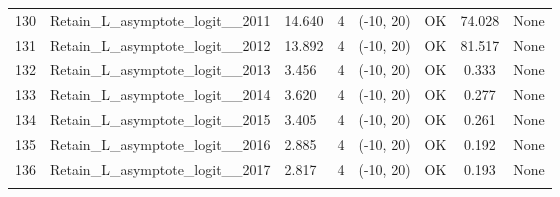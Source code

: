\documentclass[12pt,]{article}
\begin{document}
\begin{landscape}
\begin{longtable}{lp{2.5in}lrcccl}
  130 & Retain\_L\_asymptote\_logit\_\_2011 & 14.640 & 4 & (-10, 20) & OK & 74.028 & None \\ 
  131 & Retain\_L\_asymptote\_logit\_\_2012 & 13.892 & 4 & (-10, 20) & OK & 81.517 & None \\ 
  132 & Retain\_L\_asymptote\_logit\_\_2013 & 3.456 & 4 & (-10, 20) & OK & 0.333 & None \\ 
  133 & Retain\_L\_asymptote\_logit\_\_2014 & 3.620 & 4 & (-10, 20) & OK & 0.277 & None \\ 
  134 & Retain\_L\_asymptote\_logit\_\_2015 & 3.405 & 4 & (-10, 20) & OK & 0.261 & None \\ 
  135 & Retain\_L\_asymptote\_logit\_\_2016 & 2.885 & 4 & (-10, 20) & OK & 0.192 & None \\ 
  136 & Retain\_L\_asymptote\_logit\_\_2017 & 2.817 & 4 & (-10, 20) & OK & 0.193 & None \\ 
   \hline
\hline
\label{tab:model_params}
\end{longtable}
\end{landscape}

\clearpage

\FloatBarrier
\end{document}

